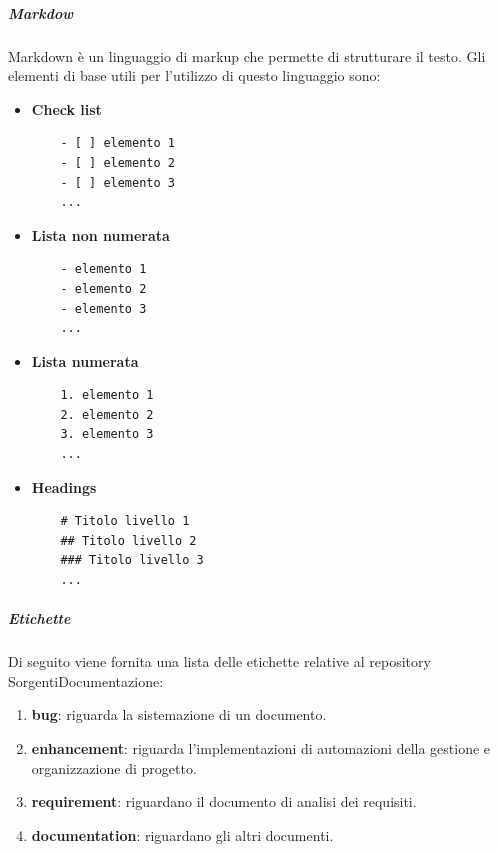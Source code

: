 \subparagraph{Markdow}
\label{subpar:markdown}
Markdown è un linguaggio di markup che permette di strutturare il testo.
Gli elementi di base utili per l'utilizzo di questo linguaggio sono:
\begin{itemize}
    \item \textbf{Check list}
    \begin{lstlisting}
    - [ ] elemento 1
    - [ ] elemento 2
    - [ ] elemento 3
    ...
    \end{lstlisting}

    \item \textbf{Lista non numerata}
    \begin{lstlisting}
    - elemento 1
    - elemento 2
    - elemento 3
    ...
    \end{lstlisting}

    \item \textbf{Lista numerata}
    \begin{lstlisting}
    1. elemento 1
    2. elemento 2
    3. elemento 3
    ...
    \end{lstlisting}

    \item \textbf{Headings}
    \begin{lstlisting}
    # Titolo livello 1
    ## Titolo livello 2
    ### Titolo livello 3
    ...
    \end{lstlisting}
    
\end{itemize}

\subparagraph{Etichette}
Di seguito viene fornita una lista delle etichette relative al repository SorgentiDocumentazione:
\begin{enumerate}
    \item \textbf{bug}: riguarda la sistemazione di un documento.
    \item \textbf{enhancement}: riguarda l'implementazioni di automazioni della gestione e organizzazione di progetto.
    \item \textbf{requirement}: riguardano il documento di analisi dei requisiti.
    \item \textbf{documentation}: riguardano gli altri documenti.
\end{enumerate}

